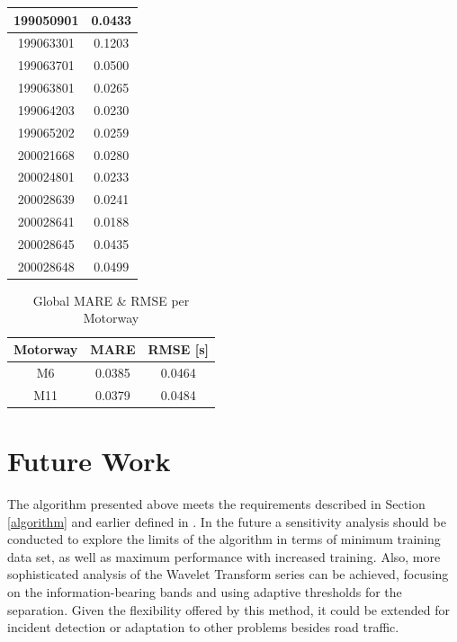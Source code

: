 \documentclass[a4paper, 10pt, conference]{ieeeconf}      %
\begin{document}
\begin{table}[htbp]
\begin{center}
\begin{tabular}{|c|c|}
			\hline
			199050901& 0.0433\\
			\hline
			199063301& 0.1203\\
			\hline
			199063701& 0.0500\\
			\hline
			199063801& 0.0265\\
			\hline
			199064203& 0.0230\\
			\hline
			199065202& 0.0259\\
			\hline
			200021668& 0.0280\\
			\hline
			200024801& 0.0233\\
			\hline
			200028639& 0.0241\\
			\hline
			200028641& 0.0188\\
			\hline
			200028645& 0.0435\\
			\hline
			200028648& 0.0499\\
			\hline
		\end{tabular}
		\label{tab1}
	\end{center}
	\label{table:m6mape}
\end{table}

\begin{table}[htbp]
	\caption{Global MARE \& RMSE per Motorway}
	\begin{center}
		\begin{tabular}{|c|c|c|}
			\hline
			\textbf{Motorway}&{\textbf{MARE}}&{\textbf{RMSE [s]}} \\
			\hline
			M6& 0.0385& 0.0464\\
			\hline
			M11& 0.0379& 0.0484\\
			\hline
		\end{tabular}
		\label{mapeglobal}
	\end{center}
\end{table}

\section{Future Work}
The algorithm presented above meets the requirements described in Section \ref{algorithm} and earlier defined in \cite{ttprofiles}.
In the future a sensitivity analysis should be conducted to explore the limits of the algorithm in terms of minimum training data set, as well as maximum performance with increased training.
Also, more sophisticated analysis of the Wavelet Transform series can be achieved, focusing on the information-bearing bands and using adaptive thresholds for the separation.
Given the flexibility offered by this method, it could be extended for incident detection or adaptation to other problems besides road traffic.
\end{document}
